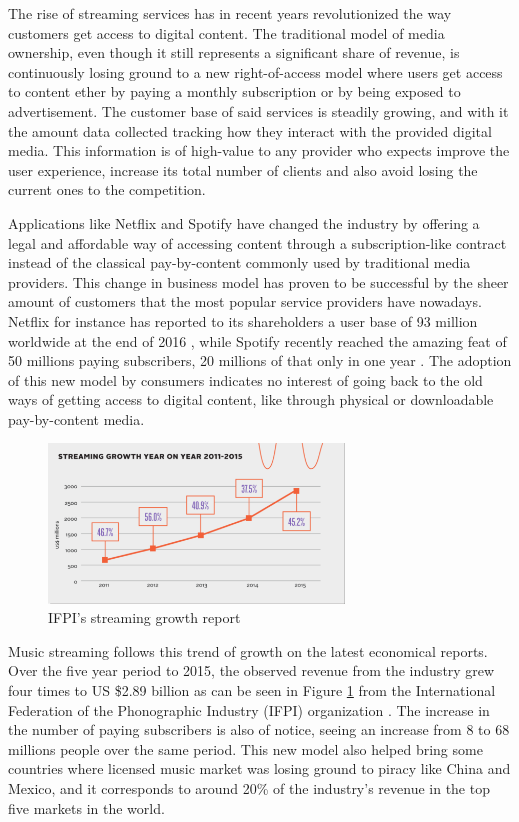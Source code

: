 \documentclass{kththesis}
\begin{document}
	The rise of streaming services has in recent years revolutionized the way customers get access to digital content. The traditional model of media ownership, even though it still represents a significant share of revenue, is continuously losing ground to a new right-of-access model where users get access to content ether by paying a monthly subscription or by being exposed to advertisement. The customer base of said services is steadily growing, and with it the amount data collected tracking how they interact with the provided digital media. This information is of high-value to any provider who expects improve the user experience, increase its total number of clients and also avoid losing the current ones to the competition.

	Applications like Netflix and Spotify have changed the industry by offering a legal and affordable way of accessing content through a subscription-like contract instead of the classical pay-by-content commonly used by traditional media providers. This change in business model has proven to be successful by the sheer amount of customers that the most popular service providers have nowadays. Netflix for instance has reported to its shareholders a user base of 93 million worldwide at the end of 2016 \citep{netflixsh}, while Spotify recently reached the amazing feat of 50 millions paying subscribers, 20 millions of that only in one year \citep{spotifypress}. The adoption of this new model by consumers indicates no interest of going back to the old ways of getting access to digital content, like through physical or downloadable pay-by-content media.

	\begin{figure}[h]
    \centering
    \includegraphics[width=0.7\textwidth, natwidth=580bp, natheight=313bp]{figures/ifpi_stream_growth.png}
    \caption{IFPI's streaming growth report}
    \label{fig:ifpi-growth-report}
\end{figure}

	Music streaming follows this trend of growth on the latest economical reports. Over the five year period to 2015, the observed revenue from the industry grew four times to US \$2.89 billion as can be seen in Figure \ref{fig:ifpi-growth-report} from the International Federation of the Phonographic Industry (IFPI) organization \citep{ifpi}. The increase in the number of paying subscribers is also of notice, seeing an increase from 8 to 68 millions people over the same period. This new model also helped bring some countries where licensed music market was losing ground to piracy like China and Mexico, and it corresponds to around 20\% of the industry's revenue in the top five markets in the world. 
	
\end{document}
